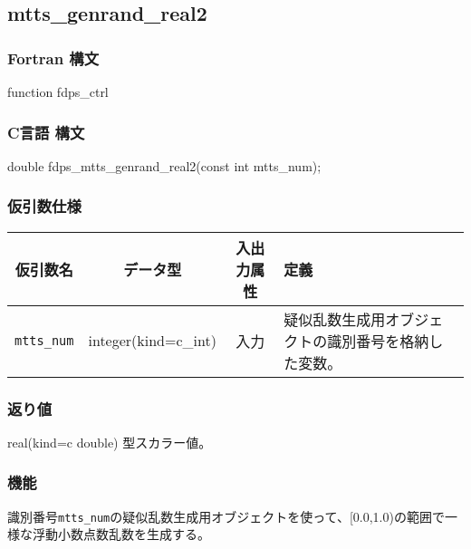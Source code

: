 \subsection{mtts\_genrand\_real2}
\subsubsection*{Fortran 構文}
\begin{screen}
\begin{spverbatim}  
function fdps_ctrl%
\end{spverbatim}
\end{screen}

\subsubsection*{C言語 構文}
\begin{screen}
\begin{spverbatim}  
double fdps_mtts_genrand_real2(const int mtts_num);
\end{spverbatim}
\end{screen}

\subsubsection*{仮引数仕様}
\begin{table}[h]
\begin{tabularx}{\linewidth}{cccX}
\toprule
\rowcolor{Snow2}
仮引数名 & データ型 & 入出力属性 & 定義 \\
\midrule
\verb|mtts_num| & integer(kind=c\_int) & 入力 & 疑似乱数生成用オブジェクトの識別番号を格納した変数。\\
\bottomrule
\end{tabularx}
\end{table}

\subsubsection*{返り値}
real(kind=c double) 型スカラー値。

\subsubsection*{機能}
識別番号\texttt{mtts\_num}の疑似乱数生成用オブジェクトを使って、[0.0,1.0)の範囲で一様な浮動小数点数乱数を生成する。
\clearpage


